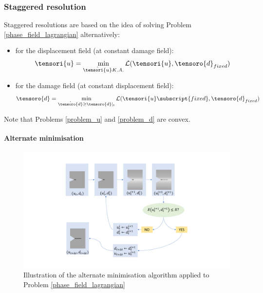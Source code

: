 
\cite{wick_modified_2017, edf_modelisation_2019}

\subsubsection{Staggered resolution}
\label{staggered_resolution}

Staggered resolutions are based on the idea of solving Problem
\ref{phase_field_lagrangian} alternatively:

\begin{itemize}
    \item for the displacement field (at constant damage field):
    \begin{equation}
        \label{problem_u}
        \tensori{u}
        =
        \min_{\hat{\tensori{u}} K.A.} \mathcal{L}(\tensori{u}, \tensoro{d}_{fixed})
    \end{equation}
    \item for the damage field (at constant displacement field):
    \begin{equation}
        \label{problem_d}
        \tensoro{d}
        =
        \min_{\hat{\tensoro{d}} \geq \tensoro{d}\vert_{t}} \mathcal{L}(\tensori{u}\subscript{fixed}, \tensoro{d}_{fixed})
    \end{equation}
\end{itemize}

Note that Problems \ref{problem_u} and
\ref{problem_d} are convex.

\paragraph{Alternate minimisation}


\begin{figure}[h!]
    \centering
    \includegraphics[width=7.cm]{img/alternate-minimisation-resolution.pdf}
    \caption{Illustration of the alternate minimisation algorithm applied to Problem \ref{phase_field_lagrangian}}
    \label{alternate_minimisation_resolution}
\end{figure}


